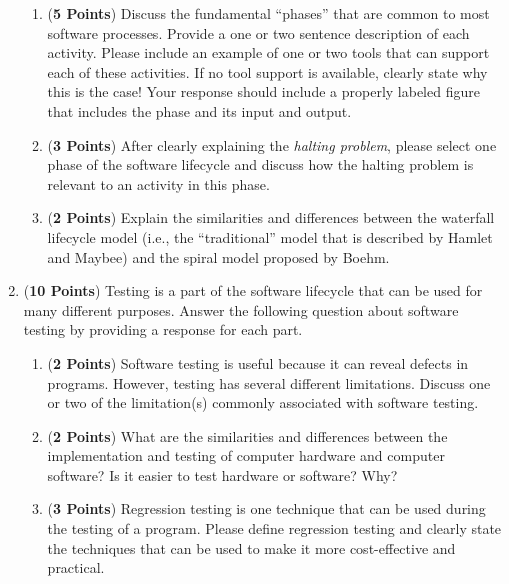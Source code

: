 \documentclass[12pt,epsf,psfig,graphics]{article}
\begin{document}
\begin{enumerate}
\begin{enumerate}
        \item ({\bf 5 Points}) Discuss the fundamental ``phases'' that
          are common to most software processes.  Provide a one or two
          sentence description of each activity.  Please include an
          example of one or two tools that can support each of these
          activities. If no tool support is available, clearly state
          why this is the case!  Your response should include a
          properly labeled figure that includes the phase and its
          input and output.
          
        \item ({\bf 3 Points}) After clearly explaining the {\em
          halting problem}, please select one phase of the software
          lifecycle and discuss how the halting problem is relevant to
          an activity in this phase.

        \item ({\bf 2 Points}) Explain the similarities and
          differences between the waterfall lifecycle model (i.e., the
          ``traditional'' model that is described by Hamlet and
          Maybee) and the spiral model proposed by Boehm.

        \end{enumerate}

\newpage

\item ({\bf 10 Points}) Testing is a part of the software lifecycle that can
be used for many different purposes.  Answer the following question about
software testing by providing a response for each part.

\begin{enumerate}       
  
\item ({\bf 2 Points}) Software testing is useful because it can
  reveal defects in programs.  However, testing has several different
  limitations.  Discuss one or two of the limitation(s) commonly
  associated with software testing.
  
\item ({\bf 2 Points}) What are the similarities and differences
  between the implementation and testing of computer hardware and
  computer software?  Is it easier to test hardware or software?  Why?
  
\item ({\bf 3 Points}) Regression testing is one technique that can be
  used during the testing of a program.  Please define regression
  testing and clearly state the techniques that can be used to make it
  more cost-effective and practical.
  

\end{enumerate}
\end{enumerate}
\end{document}
